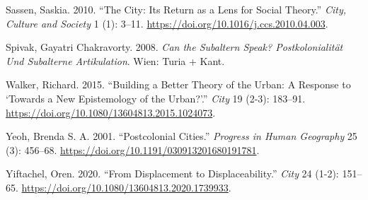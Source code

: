 \documentclass[
]{article}
\newlength{\cslhangindent}
\newlength{\cslentryspacingunit} %
\newenvironment{CSLReferences}[2] %
 {%
  \setlength{\parindent}{0pt}
  \ifodd #1
  \let\oldpar\par
  \def\par{\hangindent=\cslhangindent\oldpar}
  \fi
  \setlength{\parskip}{#2\cslentryspacingunit}
 }%
 {}
\begin{document}
\begin{CSLReferences}{1}{0}
\leavevmode{}%
Sassen, Saskia. 2010. {``The City: Its Return as a Lens for Social Theory.''} \emph{City, Culture and Society} 1 (1): 3--11. \url{https://doi.org/10.1016/j.ccs.2010.04.003}.

\leavevmode{}%
Spivak, Gayatri Chakravorty. 2008. \emph{Can the Subaltern Speak? Postkolonialit{ä}t Und Subalterne Artikulation}. Wien: Turia + Kant.

\leavevmode{}%
Walker, Richard. 2015. {``Building a Better Theory of the Urban: A Response to {`Towards a New Epistemology of the Urban?'}.''} \emph{City} 19 (2-3): 183--91. \url{https://doi.org/10.1080/13604813.2015.1024073}.

\leavevmode{}%
Yeoh, Brenda S. A. 2001. {``Postcolonial Cities.''} \emph{Progress in Human Geography} 25 (3): 456--68. \url{https://doi.org/10.1191/030913201680191781}.

\leavevmode{}%
Yiftachel, Oren. 2020. {``From Displacement to Displaceability.''} \emph{City} 24 (1-2): 151--65. \url{https://doi.org/10.1080/13604813.2020.1739933}.

\end{CSLReferences}
\end{document}
